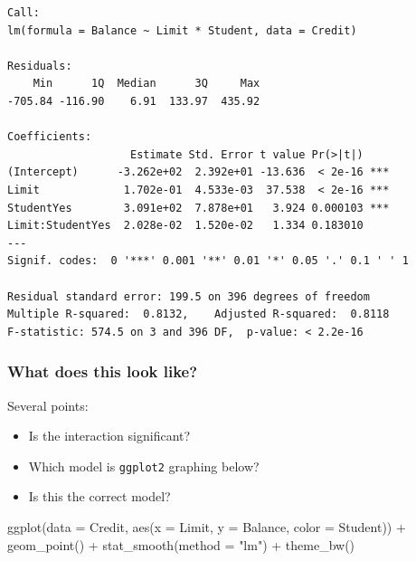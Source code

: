 \documentclass[
]{article}
\newenvironment{Shaded}{\begin{snugshade}}{\end{snugshade}}
\newcommand{\AttributeTok}[1]{\textcolor[rgb]{0.77,0.63,0.00}{#1}}
\newcommand{\FunctionTok}[1]{\textcolor[rgb]{0.00,0.00,0.00}{#1}}
\newcommand{\NormalTok}[1]{#1}
\newcommand{\SpecialCharTok}[1]{\textcolor[rgb]{0.00,0.00,0.00}{#1}}
\newcommand{\StringTok}[1]{\textcolor[rgb]{0.31,0.60,0.02}{#1}}
\providecommand{\tightlist}{%
  \setlength{\itemsep}{0pt}\setlength{\parskip}{0pt}}
\begin{document}
\begin{verbatim}
Call:
lm(formula = Balance ~ Limit * Student, data = Credit)

Residuals:
    Min      1Q  Median      3Q     Max 
-705.84 -116.90    6.91  133.97  435.92 

Coefficients:
                   Estimate Std. Error t value Pr(>|t|)    
(Intercept)      -3.262e+02  2.392e+01 -13.636  < 2e-16 ***
Limit             1.702e-01  4.533e-03  37.538  < 2e-16 ***
StudentYes        3.091e+02  7.878e+01   3.924 0.000103 ***
Limit:StudentYes  2.028e-02  1.520e-02   1.334 0.183010    
---
Signif. codes:  0 '***' 0.001 '**' 0.01 '*' 0.05 '.' 0.1 ' ' 1

Residual standard error: 199.5 on 396 degrees of freedom
Multiple R-squared:  0.8132,    Adjusted R-squared:  0.8118 
F-statistic: 574.5 on 3 and 396 DF,  p-value: < 2.2e-16
\end{verbatim}

\hypertarget{what-does-this-look-like}{%
\subsubsection{What does this look like?}\label{what-does-this-look-like}}

Several points:

\begin{itemize}
\tightlist
\item
  Is the interaction significant?
\item
  Which model is \texttt{ggplot2} graphing below?
\item
  Is this the correct model?
\end{itemize}

\begin{Shaded}
\begin{Highlighting}[]
\FunctionTok{ggplot}\NormalTok{(}\AttributeTok{data =}\NormalTok{ Credit, }\FunctionTok{aes}\NormalTok{(}\AttributeTok{x =}\NormalTok{ Limit, }\AttributeTok{y =}\NormalTok{ Balance, }\AttributeTok{color =}\NormalTok{ Student)) }\SpecialCharTok{+} 
  \FunctionTok{geom\_point}\NormalTok{() }\SpecialCharTok{+} 
  \FunctionTok{stat\_smooth}\NormalTok{(}\AttributeTok{method =} \StringTok{"lm"}\NormalTok{) }\SpecialCharTok{+} 
  \FunctionTok{theme\_bw}\NormalTok{()}
\end{Highlighting}
\end{Shaded}
\end{document}
